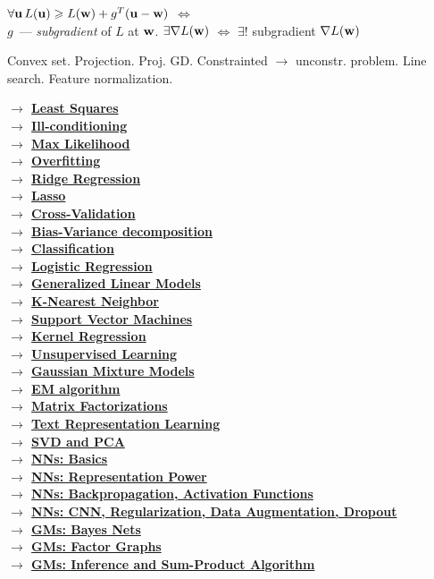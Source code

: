 \documentclass[]{article}
\newcommand{\myvector}[1]{{\bf{#1}}}
\newcommand{\w}{\myvector{w}}
\newcommand{\uu}{\myvector{u}}
\newcommand{\mytitle}[1]{ {\bf $\rightarrow$ \underline{#1}}\\}
\begin{document}
\begin{multicols*}{2}
$\forall\uu\,L(\uu)\geqslant L(\w)+g^T(\uu-\w)$ $\Leftrightarrow$\\
$g$~--- {\em subgradient} of $L$ at $\w$. $\exists \nabla L(\w)$ $\Leftrightarrow$
$\exists!$ subgradient $\nabla L(\w)$

Convex set. Projection. Proj. GD. Constrainted $\rightarrow$ unconstr. problem. Line search. Feature normalization. 

\mytitle{Least Squares}
\mytitle{Ill-conditioning}
\mytitle{Max Likelihood}
\mytitle{Overfitting}
\mytitle{Ridge Regression}
\mytitle{Lasso}
\mytitle{Cross-Validation}
\mytitle{Bias-Variance decomposition}
\mytitle{Classification}
\mytitle{Logistic Regression}
\mytitle{Generalized Linear Models}
\mytitle{K-Nearest Neighbor}
\mytitle{Support Vector Machines}
\mytitle{Kernel Regression}
\mytitle{Unsupervised Learning}
\mytitle{Gaussian Mixture Models}
\mytitle{EM algorithm}
\mytitle{Matrix Factorizations}
\mytitle{Text Representation Learning}
\mytitle{SVD and PCA}
\mytitle{NNs: Basics}
\mytitle{NNs: Representation Power}
\mytitle{NNs: Backpropagation, Activation Functions}
\mytitle{NNs: CNN, Regularization, Data Augmentation, Dropout}
\mytitle{GMs: Bayes Nets}
\mytitle{GMs: Factor Graphs}
\mytitle{GMs: Inference and Sum-Product Algorithm}
\end{multicols*}
\end{document}
